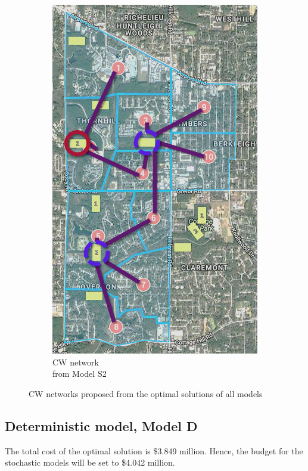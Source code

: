 \documentclass[preprint,12pt,authoryear]{elsarticle}
\begin{document}
\begin{figure}[!htb]
\begin{subfigure}[b]{0.4\textwidth}
	\includegraphics[width=\textwidth]{s2.png}
	\caption{CW network \\from Model S2}
	\label{fig:networks2}
	\end{subfigure}
	\caption{CW networks proposed from the optimal solutions of all models}
	\label{fig:results}
\end{figure}

\pagebreak
\subsection{Deterministic model, Model D}
The total cost of the optimal solution is \$3.849 million. Hence, the budget for the stochastic models will be set to \$4.042 million. 
\end{document}
